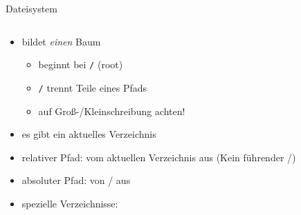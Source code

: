 \begin{frame}{Dateisystem}
  \begin{columns}[onlytextwidth]
    \begin{column}{0.475\textwidth}
      \begin{itemize}
        \item bildet \emph{einen} Baum
          \begin{itemize}
            \item beginnt bei \texttt{/} (root)
            \item \texttt{/} trennt Teile eines Pfads
            \item auf Groß-/Kleinschreibung achten!
          \end{itemize}
        \item es gibt ein aktuelles Verzeichnis
        \item relativer Pfad: vom aktuellen Verzeichnis aus (Kein führender \alert{/})
        \item absoluter Pfad: von \alert{/} aus
        \item spezielle Verzeichnisse:
      \end{itemize}
    \end{column}
  \end{columns}
\end{frame}

